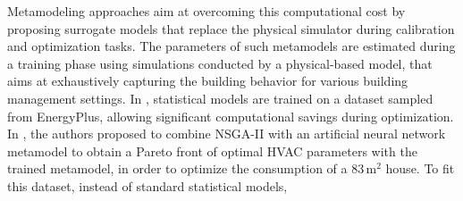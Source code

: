 \documentclass[12pt]{article}
\begin{document}

Metamodeling approaches aim at overcoming this computational cost by proposing surrogate models that replace the physical simulator during calibration and optimization tasks. The parameters of such metamodels are estimated during a training phase using simulations conducted by a physical-based model, that aims at exhaustively capturing the building behavior for various building management settings.
In \cite{Bre2020AnEM, Reynolds2018AZB}, statistical models are trained on a dataset sampled from EnergyPlus, allowing significant computational savings during optimization. In \cite{Bre2020AnEM}, the authors proposed to combine NSGA-II with an artificial neural network metamodel to obtain a Pareto front of optimal HVAC parameters with the trained metamodel, in order to optimize the consumption of a $83\,\mathrm{m}^2$ house. %
To fit this dataset, instead of standard statistical models, %
\end{document}
